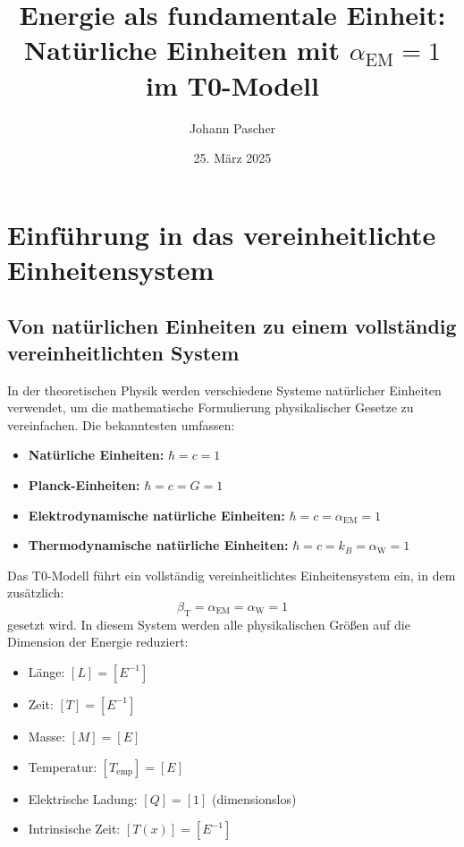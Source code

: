 \documentclass[12pt,a4paper]{article}
\newcommand{\Tfield}{T(x)}
\newcommand{\alphaEM}{\alpha_{\text{EM}}}
\newcommand{\alphaW}{\alpha_{\text{W}}}
\newcommand{\betaT}{\beta_{\text{T}}}
\begin{document}
	
	\title{Energie als fundamentale Einheit: \\ Natürliche Einheiten mit \(\alphaEM = 1\) im T0-Modell}
	\author{Johann Pascher}
	\date{25. März 2025}
	
	\maketitle
	\tableofcontents
	\newpage
	
	\section{Einführung in das vereinheitlichte Einheitensystem}
	\label{sec:intro}
	
	\subsection{Von natürlichen Einheiten zu einem vollständig vereinheitlichten System}
	\label{subsec:natural_units}
	
	In der theoretischen Physik werden verschiedene Systeme natürlicher Einheiten verwendet, um die mathematische Formulierung physikalischer Gesetze zu vereinfachen. Die bekanntesten umfassen:
	
	\begin{itemize}
		\item \textbf{Natürliche Einheiten:} \(\hbar = c = 1\)
		\item \textbf{Planck-Einheiten:} \(\hbar = c = G = 1\)
		\item \textbf{Elektrodynamische natürliche Einheiten:} \(\hbar = c = \alphaEM = 1\)
		\item \textbf{Thermodynamische natürliche Einheiten:} \(\hbar = c = k_B = \alphaW = 1\)
	\end{itemize}
	
	Das T0-Modell führt ein vollständig vereinheitlichtes Einheitensystem ein, in dem zusätzlich:
	\begin{equation}
		\label{eq:unified_system}
		\betaT = \alphaEM = \alphaW = 1
	\end{equation}
	gesetzt wird. In diesem System werden alle physikalischen Größen auf die Dimension der Energie reduziert:
	
	\begin{tcolorbox}[colback=blue!5!white,colframe=blue!75!black,title=Dimensionen im vereinheitlichten Einheitensystem]
		\begin{itemize}
			\item Länge: \([L] = [E^{-1}]\)
			\item Zeit: \([T] = [E^{-1}]\)
			\item Masse: \([M] = [E]\)
			\item Temperatur: \([T_{\text{emp}}] = [E]\)
			\item Elektrische Ladung: \([Q] = [1]\) (dimensionslos)
			\item Intrinsische Zeit: \([\Tfield] = [E^{-1}]\)
		\end{itemize}
	\end{tcolorbox}
	
\end{document}
